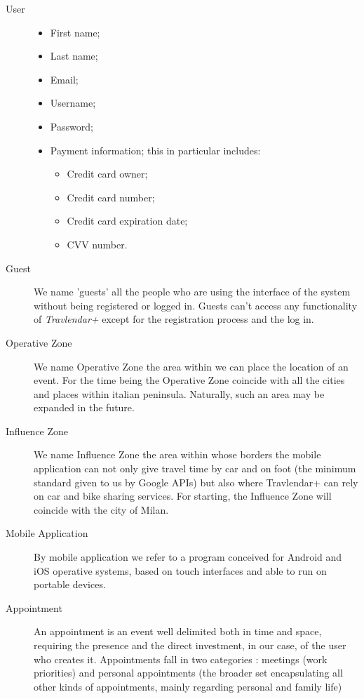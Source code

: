 \begin{description}
				\item[User] 
				\begin{itemize}
					\item First name;
					\item Last name; 
					\item Email;
					\item Username;
					\item Password;
					\item Payment information; this in particular includes:
						\begin{itemize}
							\item Credit card owner;
							\item Credit card number;
							\item Credit card expiration date;
							\item CVV number.
						\end{itemize}
				\end{itemize}
				
				\item[Guest] We name 'guests' all the people who are using the interface of the system without being registered or logged in. Guests can't access any functionality of \textit{Travlendar+} except for the registration process and the log in. 
				\item[Operative Zone] We name Operative Zone the area within we can place the location of an event. For the time being the Operative Zone coincide with all the cities and places within italian peninsula. Naturally, such an area may be expanded in the future.
				\item[Influence Zone] We name Influence Zone the area within whose borders the mobile application can not only give travel time by car and on foot (the minimum standard given to us by Google APIs) but also where Travlendar+ can rely on car and bike sharing services. For starting, the Influence Zone will coincide with the city of Milan.
				\item[Mobile Application] By mobile application we refer to a program conceived for Android and iOS operative systems, based on touch interfaces and able to run on portable devices.
				\item[Appointment] An appointment is an event well delimited both in time and space, requiring the presence and the direct investment, in our case, of the user who creates it. Appointments fall in two categories : meetings (work priorities) and personal appointments (the broader set encapsulating all other kinds of appointments, mainly regarding personal and family life)
				
\end{description}
